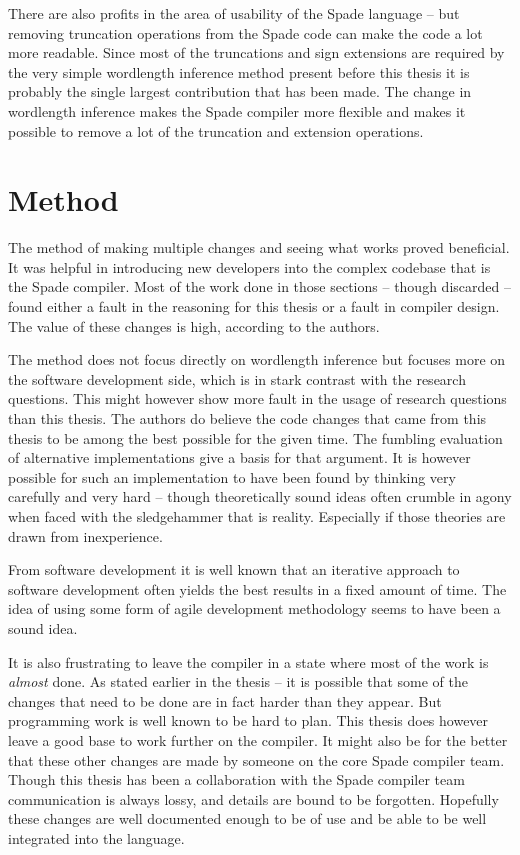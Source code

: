 There are also profits in the area of usability of the Spade language -- but removing truncation operations from the Spade code can make the code a lot more readable. Since most of the truncations and sign extensions are required by the very simple wordlength inference method present before this thesis it is probably the single largest contribution that has been made. The change in wordlength inference makes the Spade compiler more flexible and makes it possible to remove a lot of the truncation and extension operations.

\section{Method}
The method of making multiple changes and seeing what works proved beneficial. It was helpful in introducing new developers into the complex codebase that is the Spade compiler. Most of the work done in those sections -- though discarded -- found either a fault in the reasoning for this thesis or a fault in compiler design. The value of these changes is high, according to the authors.

The method does not focus directly on wordlength inference but focuses more on the software development side, which is in stark contrast with the research questions. This might however show more fault in the usage of research questions than this thesis. The authors do believe the code changes that came from this thesis to be among the best possible for the given time. The fumbling evaluation of alternative implementations give a basis for that argument. It is however possible for such an implementation to have been found by thinking very carefully and very hard -- though theoretically sound ideas often crumble in agony when faced with the sledgehammer that is reality. Especially if those theories are drawn from inexperience.

From software development it is well known that an iterative approach to software development often yields the best results in a fixed amount of time. The idea of using some form of agile development methodology seems to have been a sound idea.

It is also frustrating to leave the compiler in a state where most of the work is \textit{almost} done. As stated earlier in the thesis -- it is possible that some of the changes that need to be done are in fact harder than they appear. But programming work is well known to be hard to plan. This thesis does however leave a good base to work further on the compiler. It might also be for the better that these other changes are made by someone on the core Spade compiler team. Though this thesis has been a collaboration with the Spade compiler team communication is always lossy, and details are bound to be forgotten. Hopefully these changes are well documented enough to be of use and be able to be well integrated into the language.

